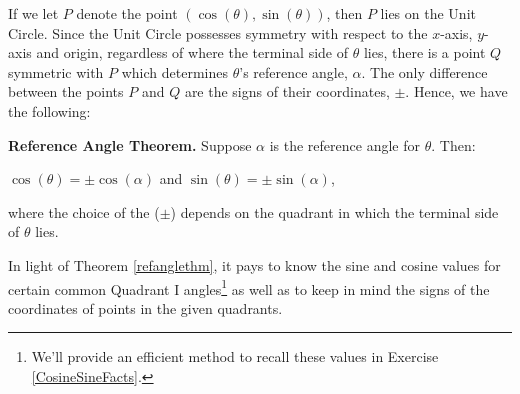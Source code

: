 \documentclass{ximera}
\begin{document}
\begin{image}

\end{image}

If we let $P$ denote the point $(\cos(\theta), \sin(\theta))$, then $P$ lies on the Unit Circle.  Since the Unit Circle possesses symmetry with respect to the $x$-axis, $y$-axis and origin, regardless of where the terminal side of $\theta$ lies, there is a point $Q$ symmetric with $P$ which determines $\theta$'s reference angle, $\alpha$.  The only difference between the points $P$ and $Q$ are the signs of their coordinates, $\pm$. Hence, we have the following:




\begin{theorem} \label{refanglethm} \textbf{Reference Angle Theorem.}  Suppose $\alpha$ is the reference angle for $\theta$.  Then:

  \centerline{$\cos(\theta) = \pm \cos(\alpha)$ and $\sin(\theta) = \pm \sin(\alpha)$,}


where the choice of the ($\pm$) depends on the quadrant in which the terminal side of $\theta$ lies.  



\end{theorem}




In light of Theorem \ref{refanglethm}, it pays to know the sine and cosine values for certain common Quadrant I angles\footnote{We'll provide an efficient method to recall these values in Exercise \ref{CosineSineFacts}.} as well as to keep in mind the signs of the coordinates of points in the given quadrants. 
\end{document}
